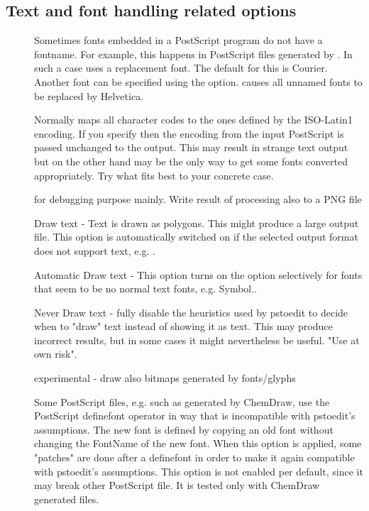 \documentclass[english,a4paper]{article}
\begin{document}
\subsection{Text and font handling related options}
\begin{description}
\item[] 
 Sometimes fonts embedded in a PostScript program do not have a fontname. For example, this happens in PostScript files generated by . In such a case  uses a replacement font. The default for this is Courier. Another font can be specified using the  option.  causes all unnamed fonts to be replaced by Helvetica. 


\item[] 
Normally  maps all character codes to the ones defined by the ISO-Latin1 encoding. If you specify  then the encoding from the input PostScript is passed unchanged to the output. This may result in strange text output but on the other hand may be the only way to get some fonts converted appropriately. Try what fits best to your concrete case. 


\item[] 
for debugging purpose mainly. Write result of processing also to a PNG file


\item[] 
Draw text - Text is drawn as polygons. This might produce a large output file. This option is automatically switched on if the selected output format does not support text, e.g. .


\item[] 
Automatic Draw text - This option turns on the  option selectively for fonts that seem to be no normal text fonts, e.g. Symbol..


\item[] 
Never Draw text -  fully disable the heuristics used by pstoedit to decide when to "draw" text instead of showing it as text. This may produce incorrect results, but in some cases it might nevertheless be useful. "Use at own risk". 


\item[] 
experimental - draw also bitmaps generated by fonts/glyphs


\item[] 
Some PostScript files, e.g. such as generated by ChemDraw, use the PostScript definefont operator in way that is incompatible with pstoedit's assumptions. The new font is defined by copying an old font without changing the FontName of the new font. When this option is applied, some "patches" are done after a definefont in order to make it again compatible with pstoedit's assumptions. This option is not enabled per default, since it may break other PostScript file. It is tested only with ChemDraw generated files.



\end{description}
\end{document}
